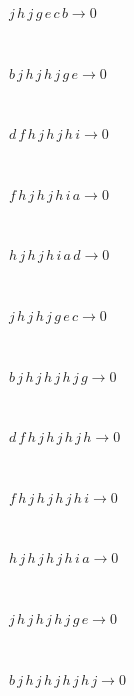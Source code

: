 \documentclass[rep10,leqno]{report}
\begin{document}
\begin{minipage}{6in}
$
j\,
 h\,
 j\,
 g\,
 e\,
 c\,
 b\rightarrow 0
$
\end{minipage}\medskip \\
\begin{minipage}{6in}
$
b\,
 j\,
 h\,
 j\,
 h\,
 j\,
 g\,
 e\rightarrow 0
$
\end{minipage}\medskip \\
\begin{minipage}{6in}
$
d\,
 f\,
 h\,
 j\,
 h\,
 j\,
 h\,
 i\rightarrow 0
$
\end{minipage}\medskip \\
\begin{minipage}{6in}
$
f\,
 h\,
 j\,
 h\,
 j\,
 h\,
 i\,
 a\rightarrow 0
$
\end{minipage}\medskip \\
\begin{minipage}{6in}
$
h\,
 j\,
 h\,
 j\,
 h\,
 i\,
 a\,
 d\rightarrow 0
$
\end{minipage}\medskip \\
\begin{minipage}{6in}
$
j\,
 h\,
 j\,
 h\,
 j\,
 g\,
 e\,
 c\rightarrow 0
$
\end{minipage}\medskip \\
\begin{minipage}{6in}
$
b\,
 j\,
 h\,
 j\,
 h\,
 j\,
 h\,
 j\,
 g\rightarrow 0
$
\end{minipage}\medskip \\
\begin{minipage}{6in}
$
d\,
 f\,
 h\,
 j\,
 h\,
 j\,
 h\,
 j\,
 h\rightarrow 0
$
\end{minipage}\medskip \\
\begin{minipage}{6in}
$
f\,
 h\,
 j\,
 h\,
 j\,
 h\,
 j\,
 h\,
 i\rightarrow 0
$
\end{minipage}\medskip \\
\begin{minipage}{6in}
$
h\,
 j\,
 h\,
 j\,
 h\,
 j\,
 h\,
 i\,
 a\rightarrow 0
$
\end{minipage}\medskip \\
\begin{minipage}{6in}
$
j\,
 h\,
 j\,
 h\,
 j\,
 h\,
 j\,
 g\,
 e\rightarrow 0
$
\end{minipage}\medskip \\
\begin{minipage}{6in}
$
b\,
 j\,
 h\,
 j\,
 h\,
 j\,
 h\,
 j\,
 h\,
 j\rightarrow 0
$
\end{minipage}\medskip \\
\end{document}
